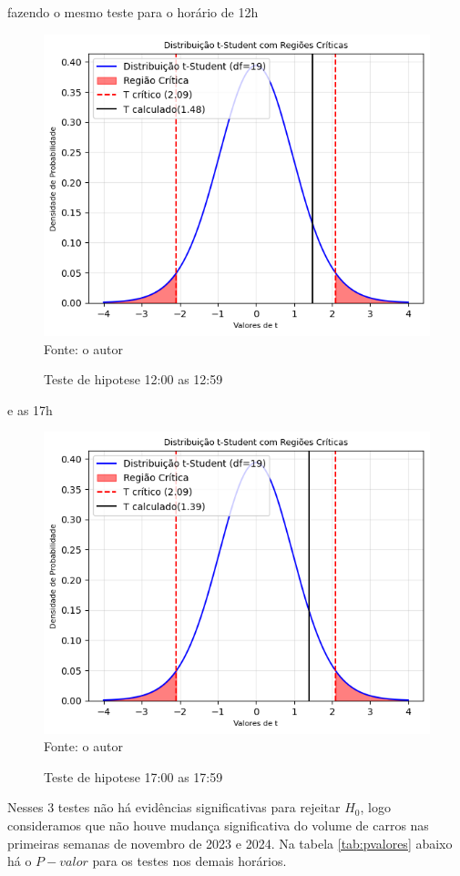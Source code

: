 fazendo o mesmo teste para o horário de 12h
\begin{figure}[H]
    \centering
    \caption{Teste de hipotese 12:00 as 12:59}
    \includegraphics[width=1\linewidth]{Imagens/12.png}
    {\footnotesize\\ Fonte: o autor}
    \label{fig:t12}
\end{figure}

e as 17h
\begin{figure}[H]
    \centering
    \caption{Teste de hipotese 17:00 as 17:59}
    \includegraphics[width=1\linewidth]{Imagens/17.png}
    {\footnotesize\\ Fonte: o autor}
    \label{fig:t17}
\end{figure}
Nesses 3 testes não há evidências significativas para rejeitar \(H_0\), logo consideramos que não houve mudança significativa do volume de carros nas primeiras semanas de novembro de 2023 e 2024.
Na tabela \ref{tab:pvalores} abaixo há o \(P-valor\) para os testes nos demais horários.

